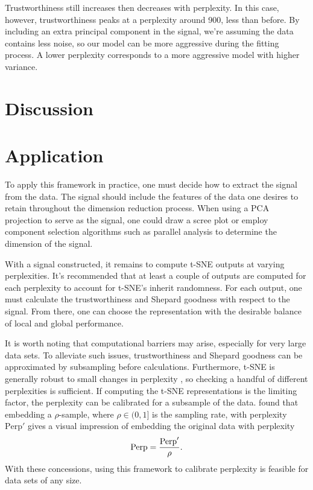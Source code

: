 \documentclass{article}
\begin{document}
Trustworthiness still increases then decreases with perplexity. In this case, however, trustworthiness peaks at a perplexity around 900, less than before. By including an extra principal component in the signal, we're assuming the data contains less noise, so our model can be more aggressive during the fitting process. A lower perplexity corresponds to a more aggressive model with higher variance.

\section{Discussion}

\section{Application}
To apply this framework in practice, one must decide how to extract the signal from the data. The signal should include the features of the data one desires to retain throughout the dimension reduction process. When using a PCA projection to serve as the signal, one could draw a scree plot or employ component selection algorithms such as parallel analysis to determine the dimension of the signal. 

\bigbreak With a signal constructed, it remains to compute t-SNE outputs at varying perplexities. It's recommended that at least a couple of outputs are computed for each perplexity to account for t-SNE's inherit randomness. For each output, one must calculate the trustworthiness and Shepard goodness with respect to the signal. From there, one can choose the representation with the desirable balance of local and global performance.

\bigbreak It is worth noting that computational barriers may arise, especially for very large data sets. To alleviate such issues, trustworthiness and Shepard goodness can be approximated by subsampling before calculations. Furthermore, t-SNE is generally robust to small changes in perplexity \cite{t-SNE}, so checking a handful of different perplexities is sufficient. If computing the t-SNE representations is the limiting factor, the perplexity can be calibrated for a subsample of the data. \cite{subsample t-SNE} found that embedding a $\rho$-sample, where $\rho \in (0,1]$ is the sampling rate, with perplexity $\textrm{Perp}'$ gives a visual impression of embedding the original data with perplexity $$\textrm{\textrm{Perp}} = \frac{\textrm{Perp}'}{\rho}.$$ With these concessions, using this framework to calibrate perplexity is feasible for data sets of any size.
\end{document}
